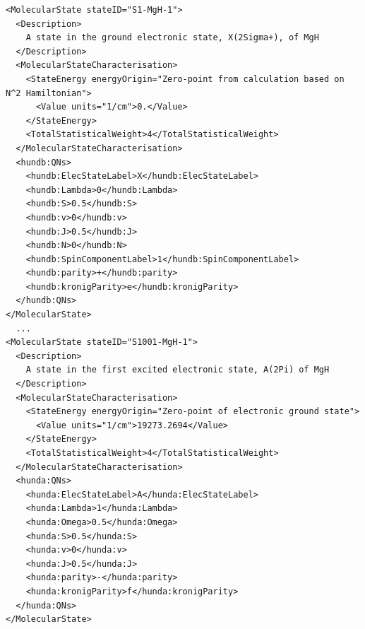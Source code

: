\documentclass[a4paper]{article} \pagestyle{plain}
\begin{document}
\begin{verbatim}
<MolecularState stateID="S1-MgH-1">
  <Description>
    A state in the ground electronic state, X(2Sigma+), of MgH
  </Description>
  <MolecularStateCharacterisation>
    <StateEnergy energyOrigin="Zero-point from calculation based on N^2 Hamiltonian">
      <Value units="1/cm">0.</Value>
    </StateEnergy>
    <TotalStatisticalWeight>4</TotalStatisticalWeight>
  </MolecularStateCharacterisation>
  <hundb:QNs>
    <hundb:ElecStateLabel>X</hundb:ElecStateLabel>
    <hundb:Lambda>0</hundb:Lambda>
    <hundb:S>0.5</hundb:S>
    <hundb:v>0</hundb:v>
    <hundb:J>0.5</hundb:J>
    <hundb:N>0</hundb:N>
    <hundb:SpinComponentLabel>1</hundb:SpinComponentLabel>
    <hundb:parity>+</hundb:parity>
    <hundb:kronigParity>e</hundb:kronigParity>
  </hundb:QNs>
</MolecularState>
  ...
<MolecularState stateID="S1001-MgH-1">
  <Description>
    A state in the first excited electronic state, A(2Pi) of MgH
  </Description>
  <MolecularStateCharacterisation>
    <StateEnergy energyOrigin="Zero-point of electronic ground state">
      <Value units="1/cm">19273.2694</Value>
    </StateEnergy>
    <TotalStatisticalWeight>4</TotalStatisticalWeight>
  </MolecularStateCharacterisation>
  <hunda:QNs>
    <hunda:ElecStateLabel>A</hunda:ElecStateLabel>
    <hunda:Lambda>1</hunda:Lambda>
    <hunda:Omega>0.5</hunda:Omega>
    <hunda:S>0.5</hunda:S>
    <hunda:v>0</hunda:v>
    <hunda:J>0.5</hunda:J>
    <hunda:parity>-</hunda:parity>
    <hunda:kronigParity>f</hunda:kronigParity>
  </hunda:QNs>
</MolecularState>
\end{verbatim}

\end{document}
